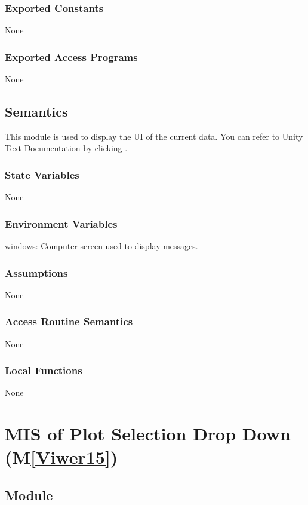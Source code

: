 \documentclass[12pt, titlepage]{article}
\newcommand{\mref}[1]{M\ref{#1}}
\begin{document}
\subsubsection{Exported Constants}
None
\subsubsection{Exported Access Programs}
None

\subsection{Semantics}
This module is used to display the UI of the current data. 
You can refer to Unity Text Documentation by clicking \tref.
\subsubsection{State Variables}
None
\subsubsection{Environment Variables}
windows: Computer screen used to display messages.
\subsubsection{Assumptions}
None
\subsubsection{Access Routine Semantics}
None
\subsubsection{Local Functions}
None

\newpage

\newcommand{\dref}{\href{https://docs.unity3d.com/Packages/com.unity.ugui@1.0/manual/script-Dropdown.html}{here}}
\section{MIS of Plot Selection Drop Down (\mref{Viwer15})} 

\subsection{Module}
\end{document}
